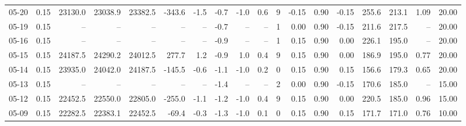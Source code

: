 \begin{threeparttable}
{\begin{tabular}{lrrrrrrrrrrrrrrrrr}
  05-20 &     0.15 & 23130.0 & 23038.9 & 23382.5 &     -343.6 &           -1.5 &                      -0.7 &                     -1.0 &                 0.6 &              9 &      -0.15 &      0.90 &          -0.15 &            255.6 &               213.1 &            1.09 &                  20.00 \\
  05-19 &     0.15 &      -- &      -- &      -- &         -- &             -- &                      -0.7 &                       -- &                  -- &              1 &       0.00 &      0.90 &          -0.15 &            211.6 &               217.5 &              -- &                  20.00 \\
  05-16 &     0.15 &      -- &      -- &      -- &         -- &             -- &                      -0.9 &                       -- &                  -- &              1 &       0.15 &      0.90 &           0.00 &            226.1 &               195.0 &              -- &                  20.00 \\
  05-15 &     0.15 & 24187.5 & 24290.2 & 24012.5 &      277.7 &            1.2 &                      -0.9 &                      1.0 &                 0.4 &              9 &       0.15 &      0.90 &           0.00 &            186.9 &               195.0 &            0.77 &                  20.00 \\
  05-14 &     0.15 & 23935.0 & 24042.0 & 24187.5 &     -145.5 &           -0.6 &                      -1.1 &                     -1.0 &                 0.2 &              0 &       0.15 &      0.90 &           0.15 &            156.6 &               179.3 &            0.65 &                  20.00 \\
  05-13 &     0.15 &      -- &      -- &      -- &         -- &             -- &                      -1.4 &                       -- &                  -- &              2 &       0.00 &      0.90 &          -0.15 &            170.6 &               185.0 &              -- &                  15.00 \\
  05-12 &     0.15 & 22452.5 & 22550.0 & 22805.0 &     -255.0 &           -1.1 &                      -1.2 &                     -1.0 &                 0.4 &              9 &       0.15 &      0.90 &           0.00 &            220.5 &               185.0 &            0.96 &                  15.00 \\
  05-09 &     0.15 & 22282.5 & 22383.1 & 22452.5 &      -69.4 &           -0.3 &                      -1.3 &                     -1.0 &                 0.1 &              0 &       0.15 &      0.90 &           0.15 &            171.7 &               171.0 &            0.76 &                  10.00 \\

\end{tabular}}
\end{threeparttable}
